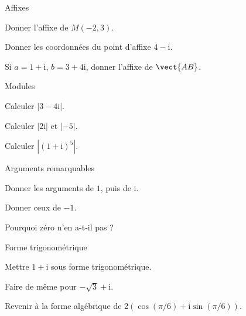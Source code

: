 \exercices
{}
\begingroup\renewcommand{\otBesoinPlace}[1]{}\begin{minipage}{\linewidth}
\begin{exercice}[1]{Affixes}

\begin{questions}
\item Donner l’affixe de $M(-2,3)$.
\item Donner les coordonnées du point d’affixe $4-\mathrm i$.
\item Si $a=1+\mathrm i$, $b=3+4\mathrm i$, donner l’affixe de $\vect{AB}$.
\end{questions}
\end{exercice}
\begin{exercice}[1]{Modules}

\begin{questions}
\item Calculer $|3-4\mathrm i|$.
\item Calculer $|2\mathrm i|$ et $|-5|$.
\item Calculer $|(1+\mathrm i)^5|$.
\end{questions}
\end{exercice}
\begin{exercice}[1]{Arguments remarquables}

\begin{questions}
\item Donner les arguments de $1$, puis de $\mathrm i$.
\item Donner ceux de $-1$.
\item Pourquoi zéro n’en a-t-il pas ?
\end{questions}
\end{exercice}
\begin{exercice}[1]{Forme trigonométrique}

\begin{questions}
\item Mettre $1+\mathrm i$ sous forme trigonométrique.
\item Faire de même pour $-\sqrt3+\mathrm i$.
\item Revenir à la forme algébrique de $2(\cos(\pi/6)+\mathrm i\sin(\pi/6))$.
\end{questions}
\end{exercice}
\end{minipage}\endgroup
\clearpage
{}
